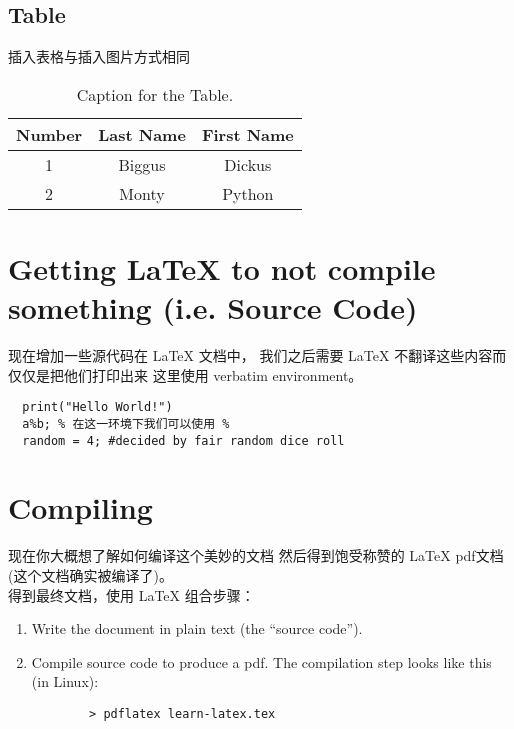 \documentclass[12pt]{article}
\begin{document}
\subsection{Table}
插入表格与插入图片方式相同

\begin{table}[H]
  \caption{Caption for the Table.}
  \begin{tabular}{c|cc} 
    Number &  Last Name & First Name \\ %
    \hline %
    1 & Biggus & Dickus \\
    2 & Monty & Python
  \end{tabular}
\end{table}

\section{Getting \LaTeX \hspace{1pt} to not compile something (i.e. Source Code)}
现在增加一些源代码在 \LaTeX \hspace{1pt} 文档中，
我们之后需要 \LaTeX \hspace{1pt} 不翻译这些内容而仅仅是把他们打印出来
这里使用 verbatim environment。 

\begin{verbatim} 
  print("Hello World!")
  a%b; % 在这一环境下我们可以使用 %
  random = 4; #decided by fair random dice roll
\end{verbatim}

\section{Compiling} 

现在你大概想了解如何编译这个美妙的文档
然后得到饱受称赞的 \LaTeX \hspace{1pt} pdf文档
(这个文档确实被编译了)。 \\
得到最终文档，使用 \LaTeX \hspace{1pt} 组合步骤：
  \begin{enumerate}
    \item Write the document in plain text (the ``source code'').
    \item Compile source code to produce a pdf. 
     The compilation step looks like this (in Linux): \\
     \begin{verbatim} 
        > pdflatex learn-latex.tex
     \end{verbatim}
  \end{enumerate}
\end{document}
